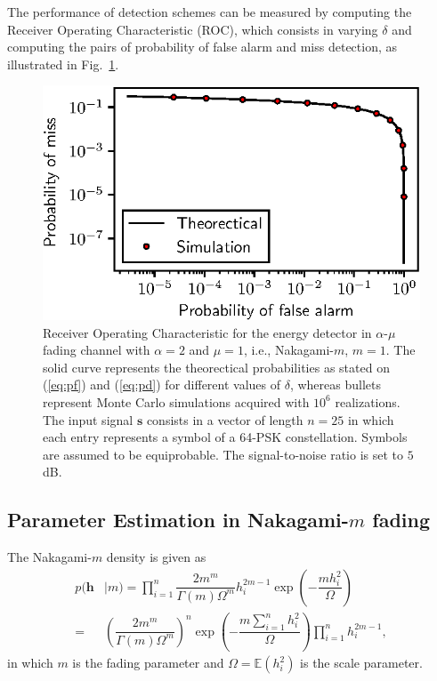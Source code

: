 \documentclass[conference, 10pt]{IEEEtran}
\begin{document}
The performance of detection schemes can be measured by computing the Receiver Operating
Characteristic (ROC), which consists in varying $\delta$ and computing the pairs of
probability of false alarm and miss detection, as illustrated in Fig.~\ref{fig:spectrum-sensing}.

\begin{figure}[!htb]
    \centering
    \includegraphics{figures/spectrum_sensing.eps}
    \caption{Receiver Operating Characteristic for the energy detector in $\alpha$-$\mu$
             fading channel with $\alpha=2$ and $\mu=1$, i.e., Nakagami-$m$, $m = 1$.
             The solid curve represents the theorectical probabilities as stated on
             (\ref{eq:pf}) and (\ref{eq:pd}) for different values of
             $\delta$, whereas bullets represent Monte Carlo simulations acquired with $10^6$ realizations.
             The input signal $\bm{s}$ consists in a vector of length $n=25$ in which each entry represents
             a symbol of a 64-PSK constellation. Symbols are assumed to be equiprobable.
             The signal-to-noise ratio is set to $5$ dB.}
    \label{fig:spectrum-sensing}
\end{figure}

\subsection{Parameter Estimation in Nakagami-$m$ fading}
The Nakagami-$m$ density is given as
\begin{align}
    p(\bm{h} &| m) = \prod_{i=1}^{n}\dfrac{2m^m}{\Gamma(m)\Omega^{m}}h_i^{2m - 1}
              \exp\left(-\dfrac{mh_i^2}{\Omega}\right) \nonumber \\
          = & \left(\dfrac{2m^m}{\Gamma(m)\Omega^{m}}\right)^{n}
          \exp\left(-\dfrac{m\sum_{i=1}^{n}h_i^2}{\Omega}\right) \prod_{i=1}^{n}h_i^{2m - 1},
\end{align}
in which $m$ is the fading parameter and $\Omega = \mathbb{E}(h_i^2)$ is the scale parameter.
\end{document}
